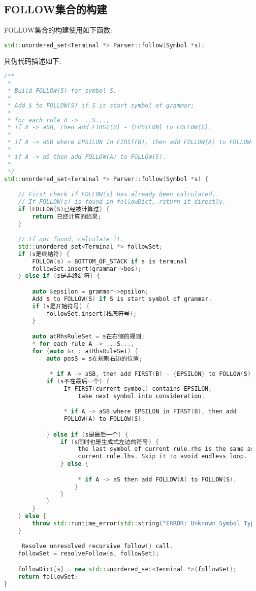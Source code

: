 \subsection{FOLLOW集合的构建}
FOLLOW集合的构建使用如下函数:
\begin{lstlisting}[language=c++]
std::unordered_set<Terminal *> Parser::follow(Symbol *s);
\end{lstlisting}
其伪代码描述如下:
\begin{lstlisting}[language=c++]
/**
 *
 * Build FOLLOW(S) for symbol S.
 *
 * Add $ to FOLLOW(S) if S is start symbol of grammar;
 *
 * for each rule A -> ...S...,
 * if A -> aSB, then add FIRST(B) - {EPSILON} to FOLLOW(S).
 *
 * if A -> aSB where EPSILON in FIRST(B), then add FOLLOW(A) to FOLLOW(S).
 *
 * if A -> aS then add FOLLOW(A) to FOLLOW(S).
 *
 */
std::unordered_set<Terminal *> Parser::follow(Symbol *s) {

    // First check if FOLLOW(s) has already been calculated.
    // If FOLLOW(s) is found in followDict, return it directly.
    if (FOLLOW(S)已经被计算过) {
        return 已经计算的结果;
    }

    // If not found, calculate it.
    std::unordered_set<Terminal *> followSet;
    if (s是终结符) {
        FOLLOW(s) = BOTTOM_OF_STACK if s is terminal
        followSet.insert(grammar->bos);
    } else if (s是非终结符) {

        auto &epsilon = grammar->epsilon;
        Add $ to FOLLOW(S) if S is start symbol of grammar.
        if (s是开始符号) {
            followSet.insert(栈底符号);
        }

        auto atRhsRuleSet = s在右侧的规则;
        * for each rule A -> ...S...,
        for (auto &r : atRhsRuleSet) {
            auto posS = s在规则右边的位置;

             * if A -> aSB, then add FIRST(B) - {EPSILON} to FOLLOW(S).
            if (s不在最后一个) {
                 If FIRST(current symbol) contains EPSILON,
                     take next symbol into consideration.

                 * if A -> aSB where EPSILON in FIRST(B), then add
                 FOLLOW(A) to FOLLOW(S).

            } else if (s是最后一个) {
                if (s同时也是生成式左边的符号) {
                     the last symbol of current rule.rhs is the same as
                     current rule.lhs. Skip it to avoid endless loop.
                } else {

                     * if A -> aS then add FOLLOW(A) to FOLLOW(S).
                    }
                }
            }
        }
    } else {
        throw std::runtime_error(std::string("ERROR: Unknown Symbol Type"));
    }

     Resolve unresolved recursive follow() call.
    followSet = resolveFollow(s, followSet);

    followDict[s] = new std::unordered_set<Terminal *>(followSet);
    return followSet;
}
\end{lstlisting}
